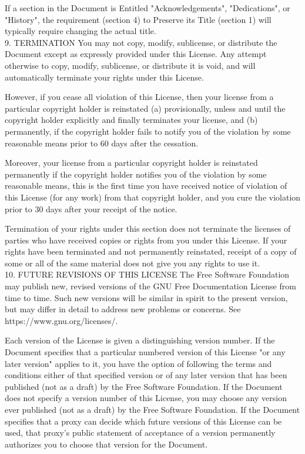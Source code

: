 \documentclass[10pt,a4paper]{article}
\begin{document}
\begin{scriptsize}
If a section in the Document is Entitled "Acknowledgements", "Dedications", or "History", the requirement (section 4) to Preserve its Title (section 1) will typically require changing the actual title.\\

9. TERMINATION
You may not copy, modify, sublicense, or distribute the Document except as expressly provided under this License. Any attempt otherwise to copy, modify, sublicense, or distribute it is void, and will automatically terminate your rights under this License.

However, if you cease all violation of this License, then your license from a particular copyright holder is reinstated (a) provisionally, unless and until the copyright holder explicitly and finally terminates your license, and (b) permanently, if the copyright holder fails to notify you of the violation by some reasonable means prior to 60 days after the cessation.

Moreover, your license from a particular copyright holder is reinstated permanently if the copyright holder notifies you of the violation by some reasonable means, this is the first time you have received notice of violation of this License (for any work) from that copyright holder, and you cure the violation prior to 30 days after your receipt of the notice.

Termination of your rights under this section does not terminate the licenses of parties who have received copies or rights from you under this License. If your rights have been terminated and not permanently reinstated, receipt of a copy of some or all of the same material does not give you any rights to use it.\\

10. FUTURE REVISIONS OF THIS LICENSE
The Free Software Foundation may publish new, revised versions of the GNU Free Documentation License from time to time. Such new versions will be similar in spirit to the present version, but may differ in detail to address new problems or concerns. See https://www.gnu.org/licenses/.

Each version of the License is given a distinguishing version number. If the Document specifies that a particular numbered version of this License "or any later version" applies to it, you have the option of following the terms and conditions either of that specified version or of any later version that has been published (not as a draft) by the Free Software Foundation. If the Document does not specify a version number of this License, you may choose any version ever published (not as a draft) by the Free Software Foundation. If the Document specifies that a proxy can decide which future versions of this License can be used, that proxy's public statement of acceptance of a version permanently authorizes you to choose that version for the Document.\\


\end{scriptsize}
\end{document}
